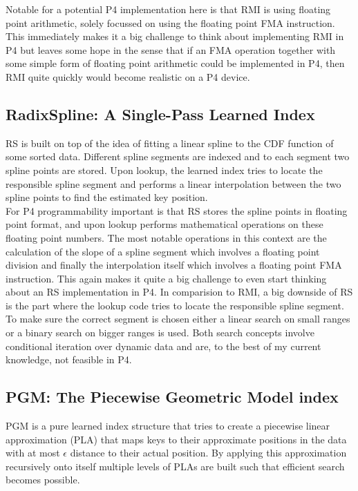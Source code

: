 Notable for a potential P4 implementation here is that RMI is using floating point arithmetic, solely focussed on using the floating point FMA instruction. This immediately makes it a big challenge to think about implementing RMI in P4 but leaves some hope in the sense that if an FMA operation together with some simple form of floating point arithmetic could be implemented in P4, then RMI quite quickly would become realistic on a P4 device.

\subsection{RadixSpline: A Single-Pass Learned Index}
RS \cite{radixspline} is built on top of the idea of fitting a linear spline to the CDF function of some sorted data. Different spline segments are indexed and to each segment two spline points are stored. Upon lookup, the learned index tries to locate the responsible spline segment and performs a linear interpolation between the two spline points to find the estimated key position.\\

For P4 programmability important is that RS stores the spline points in floating point format, and upon lookup performs mathematical operations on these floating point numbers. The most notable operations in this context are the calculation of the slope of a spline segment which involves a floating point division and finally the interpolation itself which involves a floating point FMA instruction. This again makes it quite a big challenge to even start thinking about an RS implementation in P4. In comparision to RMI, a big downside of RS is the part where the lookup code tries to locate the responsible spline segment. To make sure the correct segment is chosen either a linear search on small ranges or a binary search on bigger ranges is used. Both search concepts involve conditional iteration over dynamic data and are, to the best of my current knowledge, not feasible in P4.

\subsection{PGM: The Piecewise Geometric Model index}
PGM \cite{pgm} is a pure learned index structure that tries to create a piecewise linear approximation (PLA) that maps keys to their approximate positions in the data with at most $\epsilon$ distance to their actual position. By applying this approximation recursively onto itself multiple levels of PLAs are built such that efficient search becomes possible.\\


